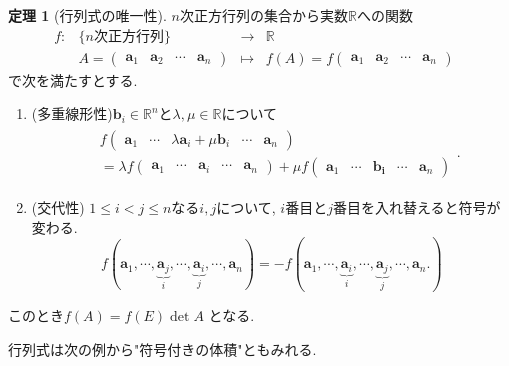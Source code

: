 \documentclass[dvipdfmx,a4paper,11pt]{article}
\newcommand{\R}{\mathbb{R}}
\theoremstyle{definition}
\newtheorem{thm}{定理}
\begin{document}
 \begin{tcolorbox}[
    colback = white,
    colframe = green!35!black,
    fonttitle = \bfseries,
    breakable = true]
    \begin{thm}[行列式の唯一性]
    \label{thm-det}
    $n$次正方行列の集合から実数$\R$への関数
    $$
\begin{array}{ccccc}
f: &\{\text{$n$次正方行列} \}& \rightarrow & \R& \\
&
A
=
    \begin{pmatrix}
    \bm{a}_1&\bm{a}_2&\cdots&\bm{a}_n
    \end{pmatrix}
 & 
 \longmapsto & 
 f(A)=f\begin{pmatrix}
    \bm{a}_1&\bm{a}_2&\cdots&\bm{a}_n
    \end{pmatrix}
 &
\end{array}
$$
で次を満たすとする.
       \begin{enumerate}
    \setlength{\parskip}{0cm} 
  \setlength{\itemsep}{0cm}
\item (多重線形性)$\bm{b}_{i} \in \R^n$と$\lambda, \mu \in \R$について
\begin{align*}
\begin{split}
&f\begin{pmatrix}
    \bm{a}_1&\cdots&\lambda\bm{a}_i+\mu\bm{b}_i&\cdots&\bm{a}_n
    \end{pmatrix} \\
&=
\lambda f\begin{pmatrix}
    \bm{a}_1&\cdots&\bm{a}_i&\cdots&\bm{a}_n
    \end{pmatrix}
+
\mu f\begin{pmatrix}
    \bm{a}_1&\cdots&\bm{b_i}&\cdots&\bm{a}_n
    \end{pmatrix}
    \end{split}.
\end{align*}
\item (交代性) $1\le i< j \le n$なる$i,j$について, $i$番目と$j$番目を入れ替えると符号が変わる. 
$$
f(
    \bm{a}_1, \cdots, \underbrace{\bm{a}_j}_{i}, \cdots , \underbrace{\bm{a}_i}_{j}, \cdots, \bm{a}_n
)
=
-f(
    \bm{a}_1, \cdots, \underbrace{\bm{a}_i}_{i}, \cdots , \underbrace{\bm{a}_j}_{j}, \cdots, \bm{a}_n.
)
$$
  \end{enumerate}
 このとき$ f(A) = f(E) \det A$
 となる.
     \end{thm}
 \end{tcolorbox}
 
 
行列式は次の例から"符号付きの体積"ともみれる.
\end{document}
